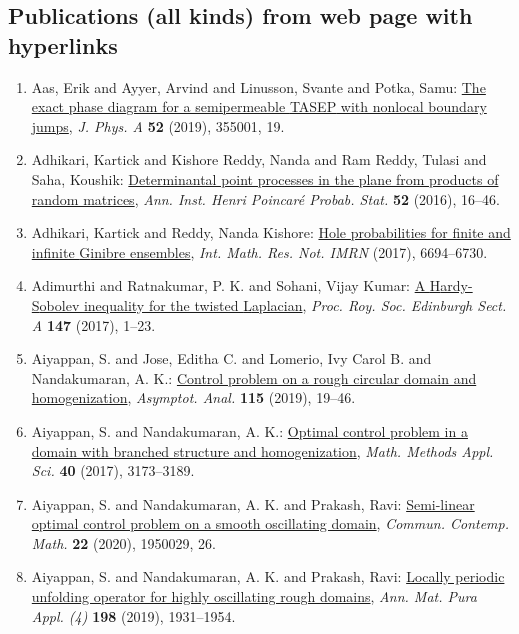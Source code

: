 \subsection{Publications (all kinds) from web page with hyperlinks}

\begin{enumerate}
\item Aas, Erik and Ayyer, Arvind and Linusson, Svante and Potka,
Samu: \href{https://doi.org/10.1088/1751-8121/ab2e96}{The exact phase diagram for a semipermeable {TASEP} with
nonlocal boundary jumps}, \emph{J. Phys. A} {\bf 52} (2019), 355001, 19.
\item Adhikari, Kartick and Kishore Reddy, Nanda and Ram Reddy,
Tulasi and Saha, Koushik: \href{https://doi.org/10.1214/14-AIHP632}{Determinantal point processes in the plane from products of
random matrices}, \emph{Ann. Inst. Henri Poincar\'{e} Probab. Stat.} {\bf 52} (2016), 16--46.
\item Adhikari, Kartick and Reddy, Nanda Kishore: \href{https://doi.org/10.1093/imrn/rnw207}{Hole probabilities for finite and infinite {G}inibre
ensembles}, \emph{Int. Math. Res. Not. IMRN} {\bf } (2017), 6694--6730.
\item Adimurthi and Ratnakumar, P. K. and Sohani, Vijay Kumar: \href{https://doi.org/10.1017/S0308210516000081}{A {H}ardy-{S}obolev inequality for the twisted {L}aplacian}, \emph{Proc. Roy. Soc. Edinburgh Sect. A} {\bf 147} (2017), 1--23.
\item Aiyappan, S. and Jose, Editha C. and Lomerio, Ivy Carol B. and
Nandakumaran, A. K.: \href{https://doi.org/10.3233/asy-191526}{Control problem on a rough circular domain and homogenization}, \emph{Asymptot. Anal.} {\bf 115} (2019), 19--46.
\item Aiyappan, S. and Nandakumaran, A. K.: \href{https://doi.org/10.1002/mma.4231}{Optimal control problem in a domain with branched structure
and homogenization}, \emph{Math. Methods Appl. Sci.} {\bf 40} (2017), 3173--3189.
\item Aiyappan, S. and Nandakumaran, A. K. and Prakash, Ravi: \href{https://doi.org/10.1142/S0219199719500299}{Semi-linear optimal control problem on a smooth oscillating
domain}, \emph{Commun. Contemp. Math.} {\bf 22} (2020), 1950029, 26.
\item Aiyappan, S. and Nandakumaran, A. K. and Prakash, Ravi: \href{https://doi.org/10.1007/s10231-019-00848-7}{Locally periodic unfolding operator for highly oscillating
rough domains}, \emph{Ann. Mat. Pura Appl. (4)} {\bf 198} (2019), 1931--1954.

\end{enumerate}

